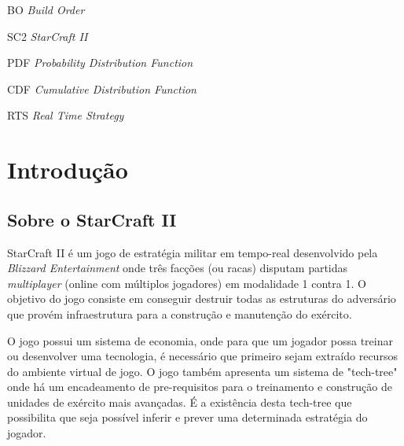 
\listoffigures*
\cleardoublepage

\listoftables*
\cleardoublepage

\begin{siglas}
	\item[BO]		\emph{Build Order}
	\item[SC2]		\emph{StarCraft II}
	\item[PDF]		\emph{Probability Distribution Function}
	\item[CDF]		\emph{Cumulative Distribution Function}
	\item[RTS]		\emph{Real Time Strategy}
\end{siglas}

\tableofcontents*
\cleardoublepage

\textual
	\chapter{Introdução}
		\section{Sobre o StarCraft II}

StarCraft II é um jogo de estratégia militar em tempo-real desenvolvido pela \textit{Blizzard Entertainment} onde três facções (ou \glspl{raca}) disputam partidas \textit{multiplayer} (online com múltiplos jogadores) em modalidade 1 contra 1. O objetivo do jogo consiste em conseguir destruir todas as \glspl{estrutura} do adversário que provém infraestrutura para a construção e manutenção do exército.

O jogo possui um sistema de economia, onde para que um jogador possa treinar ou desenvolver uma tecnologia, é necessário que primeiro sejam extraído \glspl{recurso} do ambiente virtual de jogo. O jogo também apresenta um sistema de "\gls{tech-tree}" onde há um encadeamento de pre-requisitos para o treinamento e construção de \glspl{unidade} de exército mais avançadas. É a existência desta \gls{tech-tree} que possibilita que seja possível inferir e prever uma determinada estratégia do jogador. 

